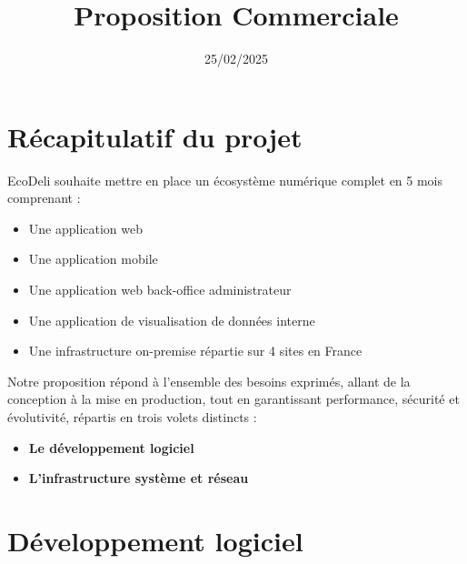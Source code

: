 \documentclass{report}
\title{Proposition Commerciale}
\date{25/02/2025}
\begin{document}
\maketitle

\section*{\centering Récapitulatif du projet}
\vspace{0.5cm}
\noindent EcoDeli souhaite mettre en place un écosystème numérique complet en 5 mois comprenant :
\begin{itemize}
    \item Une application web
    \item Une application mobile
    \item Une application web back-office administrateur
    \item Une application de visualisation de données interne
    \item Une infrastructure on-premise répartie sur 4 sites en France
\end{itemize}
\vspace{0.4cm}
\noindent Notre proposition répond à l'ensemble des besoins exprimés, allant de la conception à la mise en production, tout en garantissant performance, sécurité et évolutivité, répartis en trois volets distincts : 
\begin{itemize}
    \item \textbf{Le développement logiciel}
    \item \textbf{L'infrastructure système et réseau}
\end{itemize}
\vspace{1cm}

\section*{\centering Développement logiciel}
\vspace{0.5cm}
\end{document}
